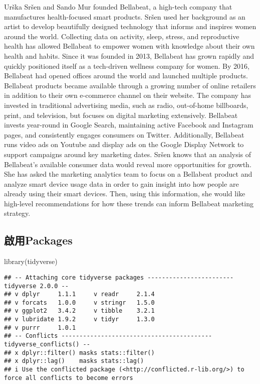 \documentclass[
]{article}
\newenvironment{Shaded}{\begin{snugshade}}{\end{snugshade}}
\newcommand{\FunctionTok}[1]{\textcolor[rgb]{0.00,0.00,0.00}{#1}}
\newcommand{\NormalTok}[1]{#1}
\begin{document}
Urška Sršen and Sando Mur founded Bellabeat, a high-tech company that
manufactures health-focused smart products. Sršen used her background as
an artist to develop beautifully designed technology that informs and
inspires women around the world. Collecting data on activity, sleep,
stress, and reproductive health has allowed Bellabeat to empower women
with knowledge about their own health and habits. Since it was founded
in 2013, Bellabeat has grown rapidly and quickly positioned itself as a
tech-driven wellness company for women. By 2016, Bellabeat had opened
offices around the world and launched multiple products. Bellabeat
products became available through a growing number of online retailers
in addition to their own e-commerce channel on their website. The
company has invested in traditional advertising media, such as radio,
out-of-home billboards, print, and television, but focuses on digital
marketing extensively. Bellabeat invests year-round in Google Search,
maintaining active Facebook and Instagram pages, and consistently
engages consumers on Twitter. Additionally, Bellabeat runs video ads on
Youtube and display ads on the Google Display Network to support
campaigns around key marketing dates. Sršen knows that an analysis of
Bellabeat's available consumer data would reveal more opportunities for
growth. She has asked the marketing analytics team to focus on a
Bellabeat product and analyze smart device usage data in order to gain
insight into how people are already using their smart devices. Then,
using this information, she would like high-level recommendations for
how these trends can inform Bellabeat marketing strategy.

\hypertarget{ux555fux7528packages}{%
\subsection{啟用Packages}\label{ux555fux7528packages}}

\begin{Shaded}
\begin{Highlighting}[]
\FunctionTok{library}\NormalTok{(tidyverse)}
\end{Highlighting}
\end{Shaded}

\begin{verbatim}
## -- Attaching core tidyverse packages ------------------------ tidyverse 2.0.0 --
## v dplyr     1.1.1     v readr     2.1.4
## v forcats   1.0.0     v stringr   1.5.0
## v ggplot2   3.4.2     v tibble    3.2.1
## v lubridate 1.9.2     v tidyr     1.3.0
## v purrr     1.0.1     
## -- Conflicts ------------------------------------------ tidyverse_conflicts() --
## x dplyr::filter() masks stats::filter()
## x dplyr::lag()    masks stats::lag()
## i Use the conflicted package (<http://conflicted.r-lib.org/>) to force all conflicts to become errors
\end{verbatim}
\end{document}
